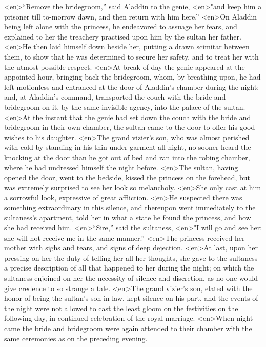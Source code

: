 <en>“Remove the bridegroom,” said Aladdin to the genie,
<en>"and keep him a prisoner till to-morrow dawn, and then return with him here.”
<en>On Aladdin being left alone with the princess, he endeavored to assuage her fears, and explained to her the treachery practised upon him by the sultan her father.
<en>He then laid himself down beside her, putting a drawn scimitar between them, to show that he was determined to secure her safety, and to treat her with the utmost possible respect.
<en>At break of day the genie appeared at the appointed hour, bringing back the bridegroom, whom, by breathing upon, he had left motionless and entranced at the door of Aladdin’s chamber during the night; and, at Aladdin’s command, transported the couch with the bride and bridegroom on it, by the same invisible agency, into the palace of the sultan.
<en>At the instant that the genie had set down the couch with the bride and bridegroom in their own chamber, the sultan came to the door to offer his good wishes to his daughter.
<en>The grand vizier’s son, who was almost perished with cold by standing in his thin under-garment all night, no sooner heard the knocking at the door than he got out of bed and ran into the robing chamber, where he had undressed himself the night before.
<en>The sultan, having opened the door, went to the bedside, kissed the princess on the forehead, but was extremely surprised to see her look so melancholy.
<en>She only cast at him a sorrowful look, expressive of great affliction.
<en>He suspected there was something extraordinary in this silence, and thereupon went immediately to the sultaness’s apartment, told her in what a state he found the princess, and how she had received him.
<en>“Sire,” said the sultaness,
<en>"I will go and see her; she will not receive me in the same manner.”
<en>The princess received her mother with sighs and tears, and signs of deep dejection.
<en>At last, upon her pressing on her the duty of telling her all her thoughts, she gave to the sultaness a precise description of all that happened to her during the night; on which the sultaness enjoined on her the necessity of silence and discretion, as no one would give credence to so strange a tale.
<en>The grand vizier’s son, elated with the honor of being the sultan’s son-in-law, kept silence on his part, and the events of the night were not allowed to cast the least gloom on the festivities on the following day, in continued celebration of the royal marriage.
<en>When night came the bride and bridegroom were again attended to their chamber with the same ceremonies as on the preceding evening.
